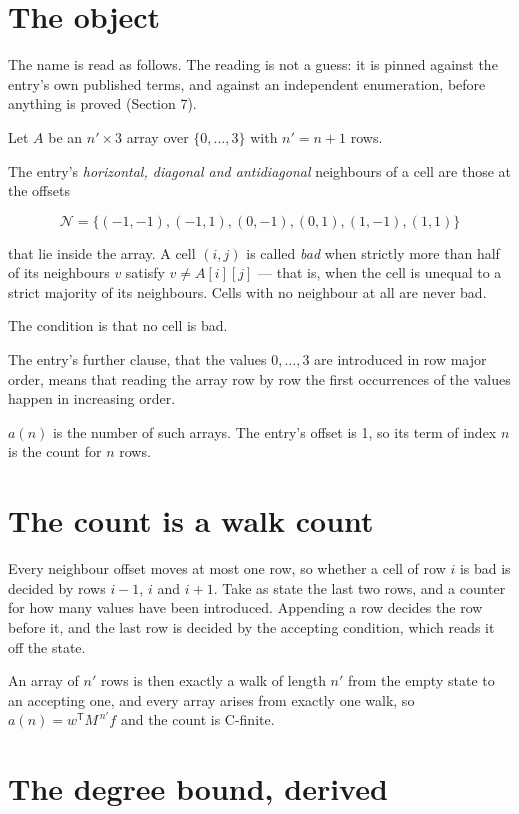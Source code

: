\documentclass[11pt]{article}
\theoremstyle{definition}
\begin{document}
\section{The object}

The name is read as follows. The reading is not a guess: it is pinned against the entry's own published terms, and against an independent enumeration, before anything is proved (Section 7).

Let $A$ be an $n' \times 3$ array over $\{0,\dots,3\}$ with $n' = n + 1$ rows.

The entry's {\itshape horizontal, diagonal and antidiagonal} neighbours of a cell are those at the offsets

\[\mathcal{N} = \{(-1,-1), (-1,1), (0,-1), (0,1), (1,-1), (1,1)\}\]

that lie inside the array. A cell $(i,j)$ is called {\itshape bad} when strictly more than half of its neighbours $v$ satisfy $v \ne A[i][j]$ --- that is, when the cell is unequal to a strict majority of its neighbours. Cells with no neighbour at all are never bad.

The condition is that no cell is bad.

The entry's further clause, that the values $0,\dots,3$ are introduced in row major order, means that reading the array row by row the first occurrences of the values happen in increasing order.

$a(n)$ is the number of such arrays. The entry's offset is 1, so its term of index $n$ is the count for $n$ rows.

\section{The count is a walk count}

Every neighbour offset moves at most one row, so whether a cell of row $i$ is bad is decided by rows $i-1$, $i$ and $i+1$. Take as state the last two rows, and a counter for how many values have been introduced. Appending a row decides the row before it, and the last row is decided by the accepting condition, which reads it off the state.

An array of $n'$ rows is then exactly a walk of length $n'$ from the empty state to an accepting one, and every array arises from exactly one walk, so $a(n) = w^{\mathsf T}M^{\,n'}f$ and the count is C-finite.

\section{The degree bound, derived}
\end{document}

